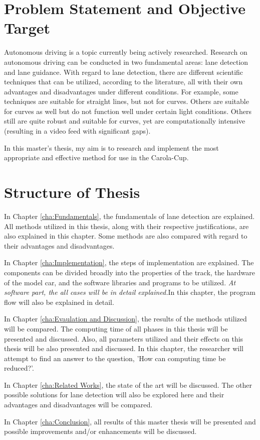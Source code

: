 \section{Problem Statement and Objective Target}\label{sec:Problem Statement and Objective Target}


Autonomous driving is a topic currently being actively researched. Research on autonomous driving can be conducted in two fundamental areas: lane detection and lane guidance. With regard to lane detection, there are different scientific techniques that can be utilized, according to the literature, all with their own advantages and disadvantages under different conditions. For example, some techniques are suitable for straight lines, but not for curves. Others are suitable for curves as well but do not function well under certain light conditions. Others still are quite robust and suitable for curves, yet are computationally intensive (resulting in a video feed with significant gaps). 

In this master's thesis, my aim is to research and implement the most appropriate and effective method for use in the Carola-Cup.


\section{Structure of Thesis}\label{sec:Structure of Thesis}


In Chapter \ref{cha:Fundamentals}, the fundamentals of lane detection are explained. All methods utilized in this thesis, along with their respective justifications, are also explained in this chapter. Some methods are also compared with regard to their advantages and disadvantages.


In Chapter \ref{cha:Implementation}, the steps of implementation are explained. The components can be divided broadly into the properties of the track, the hardware of the model car, and the software libraries and programs to be utilized. \emph{\color{blue}At software part, the all cases will be in detail explained.}In this chapter, the program flow will also be explained in detail.

In Chapter \ref{cha:Evaulation and Discussion}, the results of the methods utilized will be compared. The computing time of all phases in this thesis will be presented and discussed. Also, all parameters utilized and their effects on this thesis will be also presented and discussed. In this chapter, the researcher will attempt to find an answer to the question, 'How can computing time be reduced?'.

In Chapter \ref{cha:Related Works}, the state of the art will be discussed. The other possible solutions for lane detection will also be explored here and their advantages and disadvantages will be compared.

In Chapter \ref{cha:Conclusion}, all results of this master thesis will be presented and possible improvements and/or enhancements will be discussed.


